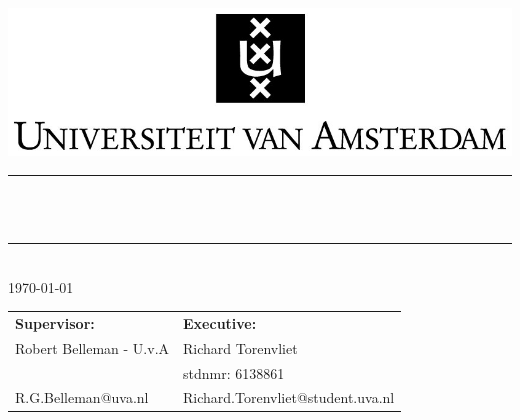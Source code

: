 \newcommand{\HRule}{\rule{\linewidth}{0.5mm}}

\begin{titlepage}
\begin{center}
\includegraphics[width=1\textwidth]{uva}\\[0.5cm]

\HRule \\[0.2cm]
{ \huge \LARGE \textbf{\projectName}\\[0.1cm]
 \vspace{0.2cm}}
\HRule \\[0.4cm]
\Large \today

\vfill

\begin{tabular}{ll}
	\textbf{Supervisor:}  & 	\textbf{Executive:}  \\
	Robert Belleman  - U.v.A &  Richard Torenvliet \\
	& stdnmr: 6138861 \\ 
	R.G.Belleman@uva.nl & Richard.Torenvliet@student.uva.nl
\end{tabular}
\end{center}
\end{titlepage}
